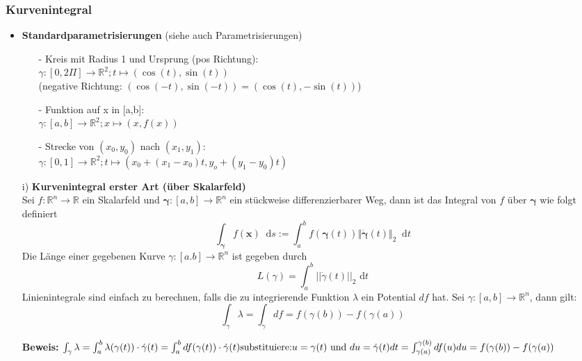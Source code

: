 \documentclass[8pt, a4paper, landscape, fleqn]{scrartcl}
\newenvironment {example}
				{\begin{itshape} \begin{small}}
				{\end{small} \end{itshape}}
\providecommand{\diff}{\mathop{} \! \mathrm{d}}
\begin{document}
\begin{multicols*}{3}
				\subsubsection{Kurvenintegral}
					\begin{itemize}
					    \item \textbf{Standardparametrisierungen} (siehe auch Parametrisierungen)
					    \begin{itemize}
					        \item[-] Kreis mit Radius 1 und Ursprung (pos Richtung):\\ $\gamma : [0,2\Pi] \rightarrow \mathbb{R}^2; t \mapsto (\cos(t), \sin(t))$\\
					        (negative Richtung: $(\cos (-t), \sin(-t)) = (\cos(t), -\sin(t))$)
					        \item[-] Funktion auf x in [a,b]:\\ $\gamma :[a,b] \rightarrow \mathbb{R}^2; x \mapsto (x,f(x))$
					        \item[-] Strecke von $(x_0,y_0)$ nach $(x_1, y_1)$:\\
					        $\gamma :[0,1] \rightarrow \mathbb{R}^2; t \mapsto (x_0 + (x_1 - x_0)t, y_o + (y_1-y_0)t)$
					    \end{itemize}
						\item[i)] \textbf{Kurvenintegral erster Art (über Skalarfeld)}\\
						Sei $f: \mathbb{R}^n \rightarrow \mathbb{R}$ ein Skalarfeld und $\bm{\gamma}: [a, b] \rightarrow \mathbb{R}^n$ ein stückweise differenzierbarer Weg, dann ist das Integral von $f$ über $\bm{\gamma}$ wie folgt definiert
						\[ \int_{\bm{\gamma}} f(\textbf{x}) \diff s := \int_a^b f(\bm{\gamma}(t)) \Vert \dot{\bm{\gamma}}(t) \Vert_2 \diff t\]
						Die Länge einer gegebenen Kurve $\gamma :[a.b]\rightarrow \mathbb{R}^n$ ist gegeben durch
						\[L(\gamma) = \int_a^b \vert \vert \dot \gamma (t) \vert\vert_2 \text{ d}t\]
						Linienintegrale sind einfach zu berechnen, falls die zu integrierende Funktion $\lambda$ ein Potential $df$ hat. Sei $\gamma : [a,b] \rightarrow \mathbb{R}^n$, dann gilt:
						\[\int_{\gamma} \lambda = \int_{\gamma} df = f(\gamma(b))-f(\gamma(a))\]
						\begin{example}{\textbf{Beweis: }}
						        $\int_{\gamma} \lambda = \int_a^b \lambda(\gamma(t)) \cdot \dot \gamma (t) 
						        = \int_a^b df(\gamma(t))\cdot \dot \gamma (t)\\
						       \text{substituiere:} u=\gamma(t) \text{ und } du= \dot \gamma (t) dt\\
						        = \int_{\gamma(a)}^{\gamma(b)} df(u) du = f(\gamma(b))-f(\gamma(a))$
						\end{example}


\end{itemize}
\end{multicols*}
\end{document}
